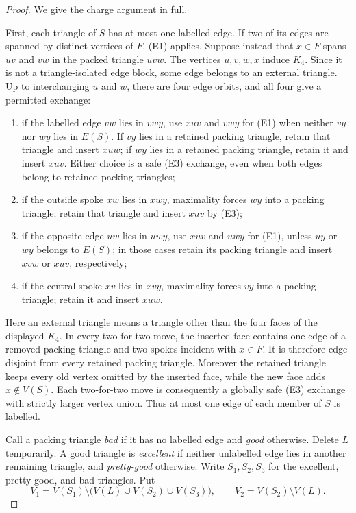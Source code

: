 \documentclass[11pt]{article}
\theoremstyle{definition}
\begin{document}
\begin{proof}
We give the charge argument in full.

First, each triangle of $S$ has at most one labelled edge.  If two of its
edges are spanned by distinct vertices of $F$, (E1) applies.  Suppose instead
that $x\in F$ spans $uv$ and $vw$ in the packed triangle $uvw$.  The vertices
$u,v,w,x$ induce $K_4$.  Since it is not a triangle-isolated edge block, some
edge belongs to an external triangle.  Up to interchanging $u$ and $w$, there
are four edge orbits, and all four give a permitted exchange:
\begin{enumerate}[label=(\roman*)]
  \item if the labelled edge $vw$ lies in $vwy$, use $xuv$ and $vwy$ for
        (E1) when neither $vy$ nor $wy$ lies in $E(S)$.  If $vy$ lies in a
        retained packing triangle, retain that triangle and insert $xuw$;
        if $wy$ lies in a retained packing triangle, retain it and insert
        $xuv$.  Either choice is a safe (E3) exchange, even when both edges
        belong to retained packing triangles;
  \item if the outside spoke $xw$ lies in $xwy$, maximality forces $wy$ into
        a packing triangle; retain that triangle and insert $xuv$ by (E3);
  \item if the opposite edge $uw$ lies in $uwy$, use $xuv$ and $uwy$ for
        (E1), unless $uy$ or $wy$ belongs to $E(S)$; in those cases retain
        its packing triangle and insert $xvw$ or $xuv$, respectively;
  \item if the central spoke $xv$ lies in $xvy$, maximality forces $vy$ into
        a packing triangle; retain it and insert $xuw$.
\end{enumerate}
Here an external triangle means a triangle other than the four faces of the
displayed $K_4$.  In every two-for-two move, the inserted face contains one
edge of a removed packing triangle and two spokes incident with $x\in F$.
It is therefore
edge-disjoint from every retained packing triangle.  Moreover the retained
triangle keeps every old vertex omitted by the inserted face, while the new
face adds $x\notin V(S)$.  Each two-for-two move is consequently a globally
safe (E3) exchange with strictly larger vertex union.  Thus at most one edge
of each member of $S$ is labelled.

Call a packing triangle \emph{bad} if it has no labelled edge and
\emph{good} otherwise.  Delete $L$ temporarily.  A good triangle is
\emph{excellent} if neither unlabelled edge lies in another remaining
triangle, and \emph{pretty-good} otherwise.  Write $S_1,S_2,S_3$ for the
excellent, pretty-good, and bad triangles.  Put
\[
  V_1=V(S_1)\setminus\bigl(V(L)\cup V(S_2)\cup V(S_3)\bigr),
  \qquad
  V_2=V(S_2)\setminus V(L).
\]


\end{proof}
\end{document}
